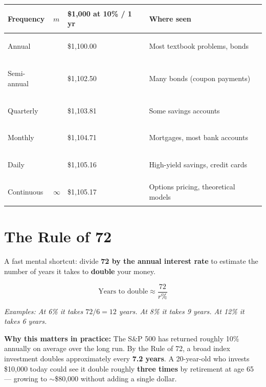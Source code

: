 \documentclass[11pt, letterpaper]{article}
\begin{document}
\noindent
{\renewcommand{\arraystretch}{1.5}
\begin{tabularx}{\textwidth}{>{\bfseries\raggedright\arraybackslash}p{4cm}
                              >{\centering\arraybackslash}p{2cm}
                              >{\centering\arraybackslash}p{3cm}
                              >{\raggedright\arraybackslash}X}
\toprule
\rowcolor{tableheadergreen}
\textbf{Frequency} & \textbf{$m$} & \textbf{\$1{,}000 at 10\% / 1 yr} & \textbf{Where seen} \\
\midrule
\rowcolor{rowA}  Annual      & 1   & \$1{,}100.00 & Most textbook problems, bonds \\
\rowcolor{rowBg} Semi-annual & 2   & \$1{,}102.50 & Many bonds (coupon payments) \\
\rowcolor{rowA}  Quarterly   & 4   & \$1{,}103.81 & Some savings accounts \\
\rowcolor{rowBg} Monthly     & 12  & \$1{,}104.71 & Mortgages, most bank accounts \\
\rowcolor{rowA}  Daily       & 365 & \$1{,}105.16 & High-yield savings, credit cards \\
\rowcolor{rowBg} Continuous  & $\infty$ & \$1{,}105.17 & Options pricing, theoretical models \\
\bottomrule
\end{tabularx}}

\section*{The Rule of 72}

A fast mental shortcut: divide \textbf{72 by the annual interest rate} to estimate the number of years it takes to \textbf{double} your money.

\[
  \text{Years to double} \approx \frac{72}{r\%}
\]

\textit{Examples: At 6\% it takes $72/6 = 12$ years. At 8\% it takes 9 years. At 12\% it takes 6 years.}

\begin{tcolorbox}[colback=notebg, colframe=noteborder, arc=3pt, boxrule=1pt]
\textbf{Why this matters in practice:} The S\&P 500 has returned roughly 10\% annually on average over the long run. By the Rule of 72, a broad index investment doubles approximately every \textbf{7.2 years}. A 20-year-old who invests \$10{,}000 today could see it double roughly \textbf{three times} by retirement at age 65 --- growing to $\sim$\$80{,}000 without adding a single dollar.
\end{tcolorbox}
\end{document}
